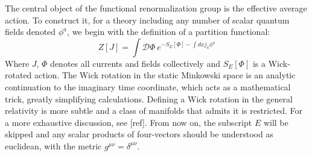 \documentclass[11pt, a4paper]{article}
\newcommand{\jhkbf}[1]{\textbf{\color{red} [#1]}}
\newcommand{\jhkbf}[1]{\textbf{\color{red} [#1]}}
\begin{document}
The central object of the functional renormalization group is the effective average action. To construct it,
for a theory including any number of scalar quantum fields denoted $\phi^a$,
we begin with the definition of a partition functional:
\begin{equation}
    Z[J] = \int \mathcal{D}\Phi \ e^{-S_E[\Phi] - \int d x j_a \phi^a}
    \label{zet}
\end{equation}
Where $J$, $\Phi$ denotes all currents and fields collectively and $S_E[\Phi]$ is a Wick-rotated action.
The Wick rotation in the static Minkowski space is an analytic continuation to the imaginary time coordinate, which acts as a mathematical trick, greatly simplifying calculations. Defining a Wick rotation in the general relativity is more subtle and a class of manifolds that admits it is restricted. For a more exhaustive discussion, see [ref].
From now on, the subscript $E$ will be skipped and any scalar products of four-vectors should be understood as euclidean, with the metric $g^{\mu\nu} = \delta^{\mu\nu}$.
\end{document}

